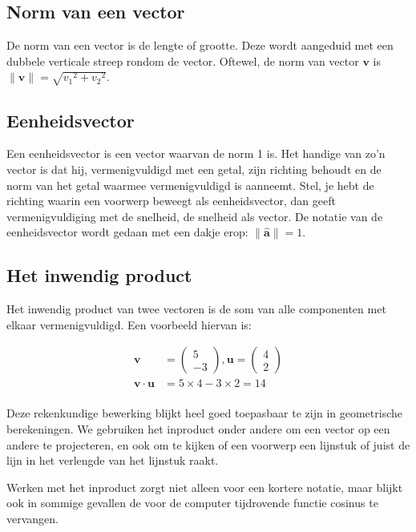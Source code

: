 \documentclass[12pt,a4paper]{article}
\begin{document}
	\subsection{Norm van een vector}
	De norm van een vector is de lengte of grootte. Deze wordt aangeduid met een dubbele verticale streep rondom de vector. Oftewel, de norm van vector $\mathbf{v}$ is $\|\mathbf{v}\| = \sqrt{{v_1}^2+{v_2}^2}$.
	
	\subsection{Eenheidsvector}
	Een eenheidsvector is een vector waarvan de norm 1 is. Het handige van zo'n vector is dat hij, vermenigvuldigd met een getal, zijn richting behoudt en de norm van het getal waarmee vermenigvuldigd is aanneemt. Stel, je hebt de richting waarin een voorwerp beweegt als eenheidsvector, dan geeft vermenigvuldiging met de snelheid, de snelheid als vector. De notatie van de eenheidsvector wordt gedaan met een dakje erop: $\|\mathbf{\hat{a}}\| = 1$.
	
	\subsection{Het inwendig product}
	Het inwendig product van twee vectoren is de som van alle componenten met elkaar vermenigvuldigd. Een voorbeeld hiervan is:
	
	\begin{equation*}
		\begin{aligned}
			\mathbf{v} &= \begin{pmatrix} 5 \\ -3 \end{pmatrix}, \mathbf{u} = \begin{pmatrix} 4 \\ 2 \end{pmatrix} \\
			\mathbf{v} \cdot \mathbf{u} &= 5 \times 4 -3 \times 2 = 14\\
		\end{aligned}
	\end{equation*}
	
	Deze rekenkundige bewerking blijkt heel goed toepasbaar te zijn in geometrische berekeningen. We gebruiken het inproduct onder andere om een vector op een andere te projecteren, en ook om te kijken of een voorwerp een lijnstuk of juist de lijn in het verlengde van het lijnstuk raakt.

	Werken met het inproduct zorgt niet alleen voor een kortere notatie, maar blijkt ook in sommige gevallen de voor de computer tijdrovende functie cosinus te vervangen.
	
\end{document}
